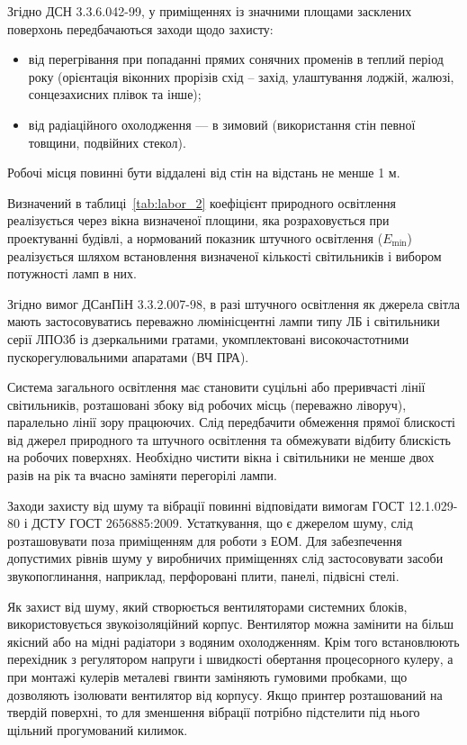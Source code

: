 Згідно ДСН 3.3.6.042-99, у приміщеннях із значними площами засклених поверхонь передбачаються заходи щодо захисту:
\begin{itemize}
	\item від перегрівання при попаданні прямих сонячних променів в теплий період року (орієнтація віконних прорізів схід -- захід, улаштування лоджій, жалюзі, сонцезахисних плівок та інше);
	\item від радіаційного охолодження --- в зимовий (використання стін певної товщини, подвійних стекол).
\end{itemize}

Робочі місця повинні бути віддалені від стін на відстань не менше 1 м.

Визначений в таблиці~\ref{tab:labor_2} коефіцієнт природного освітлення реалізується через вікна визначеної площини, яка розраховується при проектуванні будівлі, а нормований показник штучного освітлення ($E_{\min}$) реалізується шляхом встановлення визначеної кількості світильників і вибором потужності ламп в них.

Згідно вимог ДСанПіН 3.3.2.007-98, в разі штучного освітлення як джерела світла мають застосовуватись переважно люмінісцентні лампи типу ЛБ і світильники серії ЛПО3б із дзеркальними гратами, укомплектовані високочастотними пускорегулювальними апаратами (ВЧ ПРА).

Система загального освітлення має становити суцільні або преривчасті лінії світильників, розташовані збоку від робочих місць (переважно ліворуч), паралельно лінії зору працюючих. Слід передбачити обмеження прямої блискості від джерел природного та штучного освітлення та обмежувати відбиту блискість на робочих поверхнях. Необхідно чистити вікна і світильники не менше двох разів на рік та вчасно заміняти перегорілі лампи.%

Заходи захисту від шуму та вібрації повинні відповідати вимогам ГОСТ 12.1.029-80 і ДСТУ ГОСТ 2656885:2009. Устаткування, що є джерелом шуму, слід розташовувати поза приміщенням для роботи з ЕОМ. Для забезпечення допустимих рівнів шуму у виробничих приміщеннях слід застосовувати засоби звукопоглинання, наприклад, перфоровані плити, панелі, підвісні стелі.

Як захист від шуму, який створюється вентиляторами системних блоків, використовується звукоізоляційний корпус. Вентилятор можна замінити на більш якісний або на мідні радіатори з водяним охолодженням. Крім того встановлюють перехідник з регулятором напруги і швидкості обертання процесорного кулеру, а при монтажі кулерів металеві гвинти заміняють гумовими пробками, що дозволяють ізолювати вентилятор від корпусу. Якщо принтер розташований на твердій поверхні, то для зменшення вібрації потрібно підстелити під нього щільний прогумований килимок.

